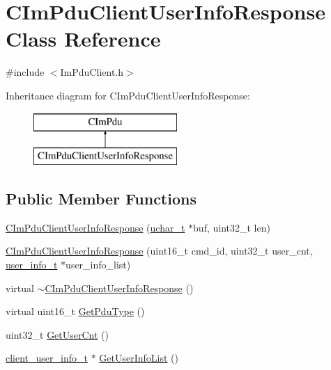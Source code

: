 \hypertarget{class_c_im_pdu_client_user_info_response}{}\section{C\+Im\+Pdu\+Client\+User\+Info\+Response Class Reference}
\label{class_c_im_pdu_client_user_info_response}


{\ttfamily \#include $<$Im\+Pdu\+Client.\+h$>$}

Inheritance diagram for C\+Im\+Pdu\+Client\+User\+Info\+Response\+:\begin{figure}[H]
\begin{center}
\leavevmode
\includegraphics[height=2.000000cm]{class_c_im_pdu_client_user_info_response}
\end{center}
\end{figure}
\subsection*{Public Member Functions}
\begin{DoxyCompactItemize}
\item 
\hyperlink{class_c_im_pdu_client_user_info_response_a303c6c6740855220835aa4041b50569f}{C\+Im\+Pdu\+Client\+User\+Info\+Response} (\hyperlink{base_2ostype_8h_a124ea0f8f4a23a0a286b5582137f0b8d}{uchar\+\_\+t} $\ast$buf, uint32\+\_\+t len)
\item 
\hyperlink{class_c_im_pdu_client_user_info_response_a297f66fc6a2ad91eb8e519c4163319b1}{C\+Im\+Pdu\+Client\+User\+Info\+Response} (uint16\+\_\+t cmd\+\_\+id, uint32\+\_\+t user\+\_\+cnt, \hyperlink{structuser__info__t}{user\+\_\+info\+\_\+t} $\ast$user\+\_\+info\+\_\+list)
\item 
virtual \hyperlink{class_c_im_pdu_client_user_info_response_aceea54f3b2f50677130be2771c354dff}{$\sim$\+C\+Im\+Pdu\+Client\+User\+Info\+Response} ()
\item 
virtual uint16\+\_\+t \hyperlink{class_c_im_pdu_client_user_info_response_a20f3ffb16a4917ddd600d5e62976ad3a}{Get\+Pdu\+Type} ()
\item 
uint32\+\_\+t \hyperlink{class_c_im_pdu_client_user_info_response_afdf01f64d9a471038318399c06984b5b}{Get\+User\+Cnt} ()
\item 
\hyperlink{structclient__user__info__t}{client\+\_\+user\+\_\+info\+\_\+t} $\ast$ \hyperlink{class_c_im_pdu_client_user_info_response_a3ef369f4541ecb5b94bca615f7384734}{Get\+User\+Info\+List} ()
\end{DoxyCompactItemize}
